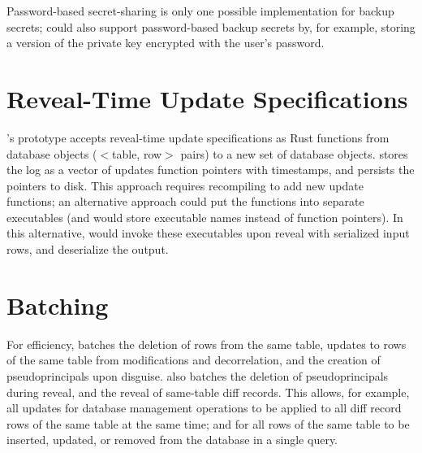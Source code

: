 
%
Password-based secret-sharing is only one possible implementation for backup
secrets; \sys could also support password-based backup secrets by, for example, storing a
version of the private key encrypted with the user's password.
%

\section{Reveal-Time Update Specifications}

\sys's prototype accepts reveal-time update specifications as Rust functions from database objects
($<$table, row$>$ pairs) to a new set of database objects. \sys stores the log
as a vector of updates function pointers with timestamps, and persists the
pointers to disk. This approach requires recompiling \sys to add new update
functions; an alternative approach could put the functions into separate
executables (and \sys would store executable names instead of function
pointers). In this alternative, \sys would invoke these executables upon reveal
with serialized input rows, and deserialize the output.

\section{Batching}
\label{s:impl:batching}

For efficiency, \sys batches the deletion of rows from the same table, updates
to rows of the same table from modifications and decorrelation, and the creation
of pseudoprincipals upon disguise. 
%
\sys also batches the deletion of pseudoprincipals during reveal, and 
the reveal of same-table diff records. This allows, for example, all updates for
database management operations to be applied to all diff record rows of the same
table at the same time; and for all rows of the same table to be inserted,
updated, or removed from the database in a single query.
%

